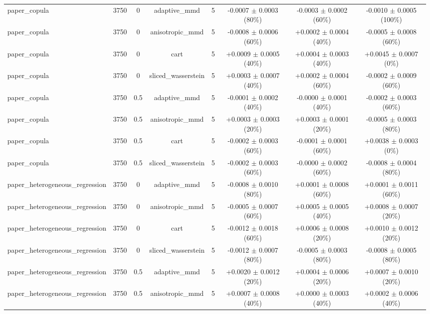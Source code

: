 \begin{table}[h]
\begin{adjustbox}{max width=\textwidth}
\begin{tabular}{lccccccc}
    paper\_copula & 3750 & 0 & adaptive\_mmd & 5 & -0.0007 $\pm$ 0.0003 (80\%) & -0.0003 $\pm$ 0.0002 (60\%) & -0.0010 $\pm$ 0.0005 (100\%) \\
    paper\_copula & 3750 & 0 & anisotropic\_mmd & 5 & -0.0008 $\pm$ 0.0006 (60\%) & +0.0002 $\pm$ 0.0004 (40\%) & -0.0005 $\pm$ 0.0008 (60\%) \\
    paper\_copula & 3750 & 0 & cart & 5 & +0.0009 $\pm$ 0.0005 (40\%) & +0.0004 $\pm$ 0.0003 (40\%) & +0.0045 $\pm$ 0.0007 (0\%) \\
    paper\_copula & 3750 & 0 & sliced\_wasserstein & 5 & +0.0003 $\pm$ 0.0007 (40\%) & +0.0002 $\pm$ 0.0004 (60\%) & -0.0002 $\pm$ 0.0009 (60\%) \\
    paper\_copula & 3750 & 0.5 & adaptive\_mmd & 5 & -0.0001 $\pm$ 0.0002 (40\%) & -0.0000 $\pm$ 0.0001 (40\%) & -0.0002 $\pm$ 0.0003 (60\%) \\
    paper\_copula & 3750 & 0.5 & anisotropic\_mmd & 5 & +0.0003 $\pm$ 0.0003 (20\%) & +0.0003 $\pm$ 0.0001 (20\%) & -0.0005 $\pm$ 0.0003 (80\%) \\
    paper\_copula & 3750 & 0.5 & cart & 5 & -0.0002 $\pm$ 0.0003 (60\%) & -0.0001 $\pm$ 0.0001 (60\%) & +0.0038 $\pm$ 0.0003 (0\%) \\
    paper\_copula & 3750 & 0.5 & sliced\_wasserstein & 5 & -0.0002 $\pm$ 0.0003 (60\%) & -0.0000 $\pm$ 0.0002 (60\%) & -0.0008 $\pm$ 0.0004 (80\%) \\
    paper\_heterogeneous\_regression & 3750 & 0 & adaptive\_mmd & 5 & -0.0008 $\pm$ 0.0010 (80\%) & +0.0001 $\pm$ 0.0008 (60\%) & +0.0001 $\pm$ 0.0011 (60\%) \\
    paper\_heterogeneous\_regression & 3750 & 0 & anisotropic\_mmd & 5 & -0.0005 $\pm$ 0.0007 (60\%) & +0.0005 $\pm$ 0.0005 (40\%) & +0.0008 $\pm$ 0.0007 (20\%) \\
    paper\_heterogeneous\_regression & 3750 & 0 & cart & 5 & -0.0012 $\pm$ 0.0018 (60\%) & +0.0006 $\pm$ 0.0008 (20\%) & +0.0010 $\pm$ 0.0012 (20\%) \\
    paper\_heterogeneous\_regression & 3750 & 0 & sliced\_wasserstein & 5 & -0.0012 $\pm$ 0.0007 (80\%) & -0.0005 $\pm$ 0.0003 (80\%) & -0.0008 $\pm$ 0.0005 (80\%) \\
    paper\_heterogeneous\_regression & 3750 & 0.5 & adaptive\_mmd & 5 & +0.0020 $\pm$ 0.0012 (20\%) & +0.0004 $\pm$ 0.0006 (20\%) & +0.0007 $\pm$ 0.0010 (20\%) \\
    paper\_heterogeneous\_regression & 3750 & 0.5 & anisotropic\_mmd & 5 & +0.0007 $\pm$ 0.0008 (40\%) & +0.0000 $\pm$ 0.0003 (40\%) & +0.0002 $\pm$ 0.0006 (40\%) \\

\end{tabular}
\end{adjustbox}
\end{table}
